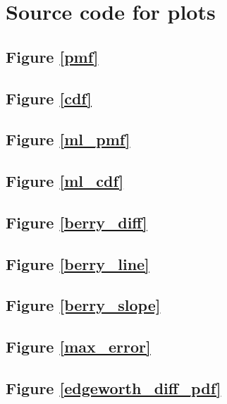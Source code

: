 \chapter{Source code for plots}

\newcommand*{\src}[1]{\section{Figure \ref{#1}}

}

\src{pmf}
\src{cdf}
\src{ml_pmf}
\src{ml_cdf}
\src{berry_diff}
\src{berry_line}
\src{berry_slope}
\src{max_error}
\src{edgeworth_diff_pdf}
